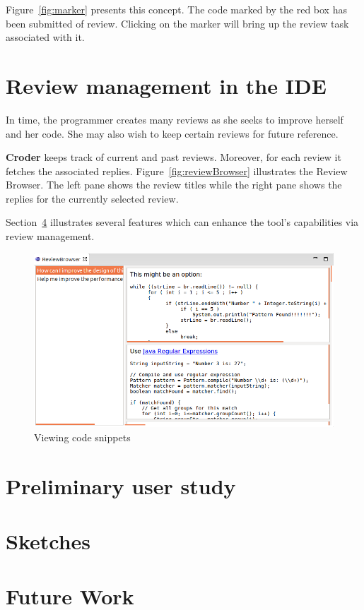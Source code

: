 \documentclass{sigchi}
\newcommand{\croder}{\textbf{Croder }}
\begin{document}
Figure~\ref{fig:marker} presents this concept. The code marked by the red box has been submitted of
review. Clicking on the marker will bring up the review task associated with it.

\section{Review management in the IDE}

In time, the programmer creates many reviews as she seeks to improve herself and her code. She may also wish to keep certain reviews for future reference. 

\croder keeps track of current and past reviews. Moreover, for each review it fetches the associated replies. Figure~\ref{fig:reviewBrowser} illustrates the Review Browser. The left pane shows the review titles while the right pane shows the replies for the currently selected review.

Section~\ref{sec:future} illustrates several features which can enhance the tool's capabilities via review management.

\begin{figure}[hbt]
	\centering
	\includegraphics[scale=0.4]{reviewBrowser.png}
\caption{Viewing code snippets}
\label{fig:snippetViewer}
\end{figure}

\section{Preliminary user study}
\section{Sketches}

\section{Future Work}
\label{sec:future}
\end{document}
